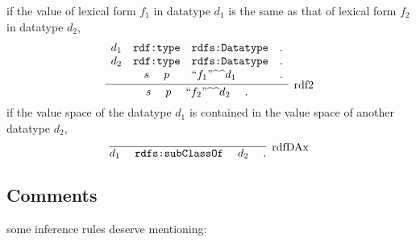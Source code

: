 \documentclass{article}
\DeclareMathOperator{\s}{\phantom{ab}}
\newcommand{\ttri}[3]{#1 \s #2 \s #3 \s.}
\newcommand{\ttp}[2]{\texttt{#1:#2}}
\DeclareMathOperator{\subc}{\ttp{rdfs}{subClassOf}}
\DeclareMathOperator{\type}{\ttp{rdf}{type}}
\begin{document}
\begin{description}
\[\]
\[\]
if the value of lexical form $f_1$ in datatype $d_1$ is the same as that of lexical form $f_2$ in datatype $d_2$, 
\[
\infer[\mathrm{rdf2}]{\ttri{s}{p}{``f_2"\text{\textasciicircum\textasciicircum}d_2}}
{\begin{array}{ccll}
d_1 & \type &  \ttp{rdfs}{Datatype}& .\\
d_2 & \type & \ttp{rdfs}{Datatype}&.\\
 &s\s p & ``f_1"\text{\textasciicircum\textasciicircum}d_1 & .
\end{array}}
\]
\[\]
if the value space of the datatype $d_1$ is contained in the value space of another  datatype $d_2$, 
\[
\infer[\mathrm{rdfDAx}]{\ttri{d_1}{\subc}{d_2}}{}
\]
\end{description}

\subsection{Comments}
 some inference rules deserve mentioning:
\end{document}
